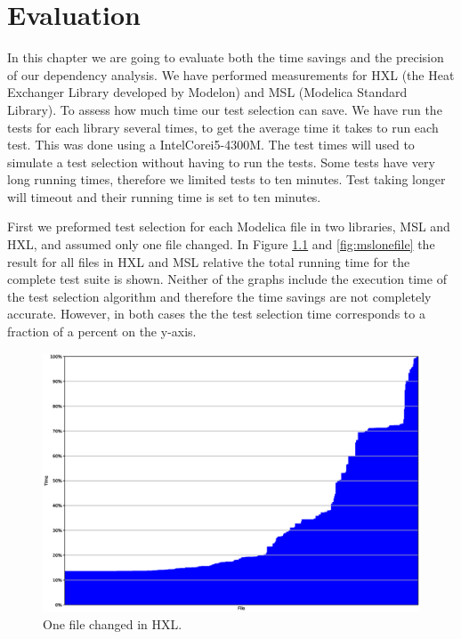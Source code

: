 \documentclass{cslthse-msc}
\begin{document}
\chapter[Evaluation]{Evaluation}
In this chapter we are going to evaluate both the time savings and the precision of our dependency analysis. We have performed measurements for HXL (the Heat Exchanger Library developed by Modelon) and MSL (Modelica Standard Library). To assess how much time our test selection can save. We have run the tests for each library several times, to get the average time it takes to run each test. This was done using a Intel\textregistered Core\texttrademark i5-4300M. The test times will used to simulate a test selection without having to run the tests. Some tests have very long running times, therefore we limited tests to ten minutes. Test taking longer will timeout and their running time is set to ten minutes.

First we preformed test selection for each Modelica file in two libraries, MSL and HXL, and assumed only one file changed. In Figure \ref{fig:hxlonefile} and \ref{fig:mslonefile} the result for all files in HXL and MSL relative the total running time for the complete test suite is shown. Neither of the graphs include the execution time of the test selection algorithm and therefore the time savings are not completely accurate. However, in both cases the the test selection time corresponds to a fraction of a percent on the y-axis. %

\begin{figure}[!htbp]
    \centering
    \includegraphics[width=\textwidth]{Graphs/HXL_one_file.eps}
    \caption{One file changed in HXL.}
    \label{fig:hxlonefile}
\end{figure}
\end{document}
